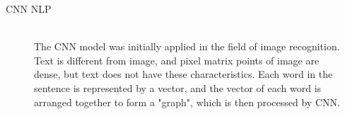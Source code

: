 \documentclass{tikzposter} %
\begin{document}
\begin{columns}
{\begin{itemize}
\end{itemize}
}


{
\begin{description}
  	\item[CNN NLP] \\
  	The CNN model was initially applied in the field of image recognition. 
    Text is different from image, and pixel matrix points of image are dense, 
    but text does not have these characteristics. Each word in the sentence is represented 
    by a vector, and the vector of each word is arranged together to form a "graph", 
    which is then processed by CNN.
   
\end{description}




}
\end{columns}
\end{document}
